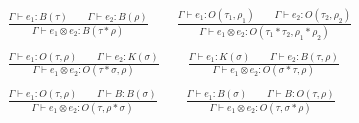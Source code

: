 \documentclass[manuscript, review, timestamp]{acmart}
\begin{document}
\begin{definition}
\begin{gather*}
    \\
    \frac{\Gamma \vdash e_1 : B(\tau) \qquad \Gamma \vdash e_2 : B(\rho) }{\Gamma \vdash e_1 \otimes e_2 : B(\tau * \rho)}
    \qquad
    \frac{\Gamma \vdash e_1 : O(\tau_1, \rho_1) \qquad \Gamma \vdash e_2 : O(\tau_2, \rho_2) }{\Gamma \vdash e_1 \otimes e_2 : O(\tau_1 * \tau_2, \rho_1 * \rho_2)}\\
    \\
    \frac{\Gamma \vdash e_1 : O(\tau, \rho) \qquad \Gamma \vdash e_2 : K(\sigma) }{\Gamma \vdash e_1 \otimes e_2 : O(\tau * \sigma, \rho)} 
    \qquad
    \frac{\Gamma \vdash e_1 : K(\sigma) \qquad \Gamma \vdash e_2 : B(\tau, \rho) }{\Gamma \vdash e_1 \otimes e_2 : O(\sigma * \tau, \rho)} \\
    \\
    \frac{\Gamma \vdash e_1 : O(\tau, \rho) \qquad \Gamma \vdash B : B(\sigma) }{\Gamma \vdash e_1 \otimes e_2 : O(\tau, \rho * \sigma)}
    \qquad
    \frac{\Gamma \vdash e_1 : B(\sigma) \qquad \Gamma \vdash B : O(\tau, \rho) }{\Gamma \vdash e_1 \otimes e_2 : O(\tau, \sigma * \rho)}
  \end{gather*}
\end{definition}





\end{document}
